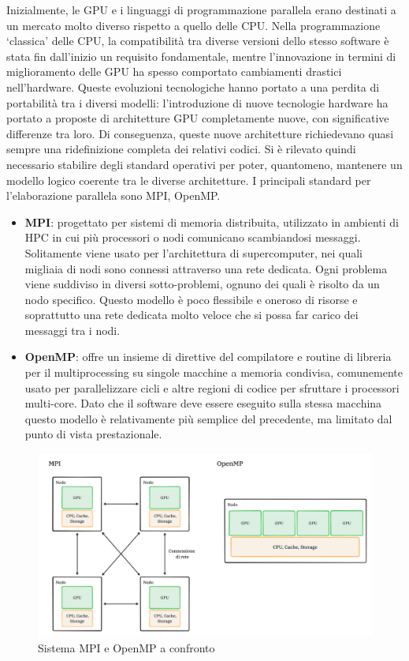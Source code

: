 Inizialmente, le GPU e i linguaggi di programmazione parallela erano destinati a un mercato molto diverso rispetto a quello delle CPU. Nella programmazione `classica' delle CPU, la compatibilità tra diverse versioni dello stesso software è stata fin dall'inizio un requisito fondamentale, mentre l'innovazione in termini di miglioramento delle GPU ha spesso comportato cambiamenti drastici nell'hardware. Queste evoluzioni tecnologiche hanno portato a una perdita di portabilità tra i diversi modelli: l'introduzione di nuove tecnologie hardware ha portato a proposte di architetture GPU completamente nuove, con significative differenze tra loro. Di conseguenza, queste nuove architetture richiedevano quasi sempre una ridefinizione completa dei relativi codici. Si è rilevato quindi necessario stabilire degli standard operativi per poter, quantomeno, mantenere un modello logico coerente tra le diverse architetture.
I principali standard per l'elaborazione parallela sono MPI, OpenMP.

\begin{itemize}
    \item \textbf{MPI}: progettato per sistemi di memoria distribuita, utilizzato in ambienti di HPC in cui più processori o nodi comunicano scambiandosi messaggi. Solitamente viene usato per l'architettura di supercomputer, nei quali migliaia di nodi sono connessi attraverso una rete dedicata. Ogni problema viene suddiviso in diversi sotto-problemi, ognuno dei quali è risolto da un nodo specifico. Questo modello è poco flessibile e oneroso di risorse e soprattutto una rete dedicata molto veloce che si possa far carico dei messaggi tra i nodi.
    \item \textbf{OpenMP}: offre un insieme di direttive del compilatore e routine di libreria per il multiprocessing su singole macchine a memoria condivisa, comunemente usato per parallelizzare cicli e altre regioni di codice per sfruttare i processori multi-core. Dato che il software deve essere eseguito sulla stessa macchina questo modello è relativamente più semplice del precedente, ma limitato dal punto di vista prestazionale.
\end{itemize}

\begin{figure}[ht]
    \centering
    \includegraphics[width=.9\linewidth]{images/chapter2/mpi_openmp.png}
    \caption{Sistema MPI e OpenMP a confronto}
    \label{fig:mpi_openmp}
\end{figure}

